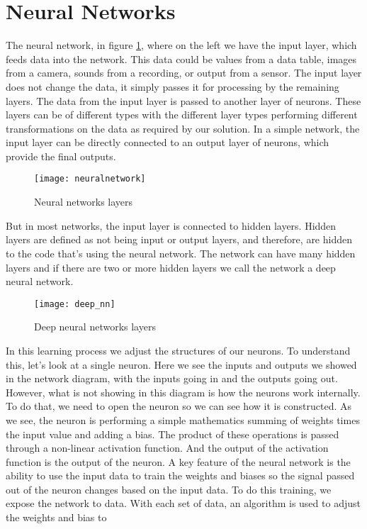 \section{Neural Networks}
\label{sec:neuralnetwork}
%
The neural network, in figure \ref{fig:nn_layer}, where on the 
left we have the input layer, which feeds data into the network.
This data could be values from a data table, images from a camera, sounds from a
recording, or output from a sensor.
The input layer does not change the data, it simply passes it for processing by
the remaining layers. The data from the input layer is passed to another layer
of neurons.
These layers can be of different types with the different layer types performing
different transformations on the data as required by our solution. In a simple
network, the input layer can be directly connected to an output layer of neurons,
which provide the final outputs.
%
\begin{figure}[!h]
\centering
\texttt{[image: neuralnetwork]}
\caption{Neural networks layers}
\label{fig:nn_layer}
\end{figure}
%
But in most networks, the input layer is connected to hidden layers.
Hidden layers are defined as not being input or output layers, and therefore,
are hidden to the code that's using the neural network.
The network can have many hidden layers and if there are two or more hidden
layers we call the network a deep neural network.
%
\begin{figure}[!h]
\centering
\texttt{[image: deep\_nn]}
\caption{Deep neural networks layers}
\label{fig:deepnn}
\end{figure}
%
In this learning process we adjust the structures of our neurons.
To understand this, let's look at a single neuron. Here we see the inputs and
outputs we showed in the network diagram, with the inputs going in and the
outputs going out.
However, what is not showing in this diagram is how the neurons work internally.
To do that, we need to open the neuron so we can see how it is constructed.
As we see, the neuron is performing a simple mathematics summing of weights times
the input value and adding a bias.
The product of these operations is passed through a non-linear activation function.
And the output of the activation function is the output of the neuron.
A key feature of the neural network is the ability to use the input data to
train the weights and biases so the signal passed out of the neuron changes
based on the input data. To do this training, we expose the network to data.
With each set of data, an algorithm is used to adjust the weights and bias to
